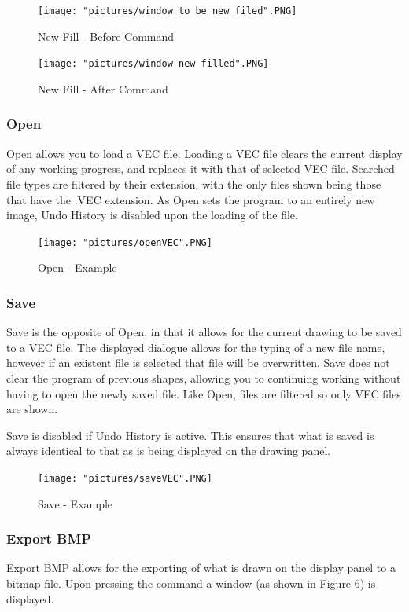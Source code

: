 \documentclass[12pt]{article} %
\begin{document}
\begin{figure}[hbtp]
\caption{New Fill - Before Command}
\centering
\texttt{[image: "pictures/window to be new filed".PNG]}
\end{figure}

\begin{figure}[hbtp]
\caption{New Fill - After Command}
\centering
\texttt{[image: "pictures/window new filled".PNG]}
\end{figure}

\subsubsection{Open}
Open allows you to load a VEC file. Loading a VEC file clears the current display of any working progress, and replaces it with that of selected VEC file. Searched file types are filtered by their extension, with the only files shown being those that have the .VEC extension. As Open sets the program to an entirely new image, Undo History is disabled upon the loading of the file.

\begin{figure}[hbtp]
\caption{Open - Example}
\centering
\texttt{[image: "pictures/openVEC".PNG]}
\end{figure}

\subsubsection{Save}
Save is the opposite of Open, in that it allows for the current drawing to be saved to a VEC file. The displayed dialogue allows for the typing of a new file name, however if an existent file is selected that file will be overwritten. Save does not clear the program of previous shapes, allowing you to continuing working without having to open the newly saved file. Like Open, files are filtered so only VEC files are shown. 

Save is disabled if Undo History is active. This ensures that what is saved is always identical to that as is being displayed on the drawing panel.

\begin{figure}[hbtp]
\caption{Save - Example}
\centering
\texttt{[image: "pictures/saveVEC".PNG]}
\end{figure}

\subsubsection{Export BMP}
Export BMP allows for the exporting of what is drawn on the display panel to a bitmap file. Upon pressing the command a window (as shown in Figure 6) is displayed.
\end{document}
